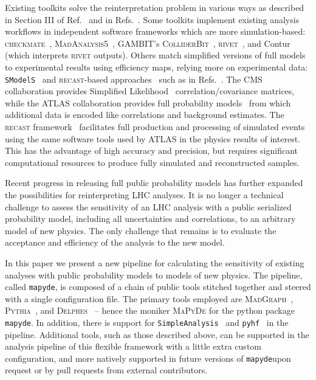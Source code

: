 \documentclass{article}
\newcommand{\mapyde}{\texttt{mapyde}}
\newcommand{\simpleanalysis}{\texttt{SimpleAnalysis}}
\newcommand{\madgraph}{\textsc{MadGraph}}
\newcommand{\pythia}{\textsc{Pythia}}
\newcommand{\delphes}{\textsc{Delphes}}
\newcommand{\pyhf}{\texttt{pyhf}}
\newcommand{\recast}{\textsc{recast}}
\begin{document}
Existing toolkits solve the reinterpretation problem in various ways as described in Section III of Ref.~\cite{LHCReinterpretationForum:2020xtr} and in Refs.~\cite{Cranmer:2021urp,Bailey:2022tdz}.  Some toolkits implement existing analysis workflows in independent software frameworks which are more simulation-based: \textsc{checkmate}~\cite{Dercks:2016npn}, \textsc{MadAnalysis5}~\cite{Conte:2018vmg,Araz:2020lnp,Dumont:2014tja}, \textsc{GAMBIT}'s \textsc{ColliderBit}~\cite{GAMBIT:2017yxo,Kvellestad:2019vxm,GAMBIT:2018gjo,zenodo:gambit}, \textsc{rivet}~\cite{Bierlich:2019rhm,Bierlich:2020wms}, and Contur~\cite{Buckley:2021neu} (which interprets \textsc{rivet} outputs).  Others match simplified versions of full models to experimental results using efficiency maps, relying more on experimental data: \texttt{SModelS}~\cite{Alguero:2021dig} and \recast-based approaches~\cite{Cranmer:2010hk} such as in Refs.~\cite{zenodo:LHCreinterpretation,llpRepo,RECAST1,RECAST2,RECAST3}.  The CMS collaboration provides Simplified Likelihood~\cite{CMS-NOTE-2017-001} correlation/covariance matrices, while the ATLAS collaboration provides full probability models~\cite{ATL-PHYS-PUB-2019-029} from which additional data is encoded like correlations and background estimates. The \recast{} framework~\cite{Cranmer:2010hk} facilitates full production and processing of simulated events using the same software tools used by ATLAS in the physics results of interest.  This has the advantage of high accuracy and precision, but requires significant computational resources to produce fully simulated and reconstructed samples.

Recent progress in releasing full public probability models has further expanded the possibilities for reinterpreting LHC analyses.  It is no longer a technical challenge to assess the sensitivity of an LHC analysis with a public serialized probability model, including all uncertainties and correlations, to an arbitrary model of new physics.  The only challenge that remains is to evaluate the acceptance and efficiency of the analysis to the new model.

In this paper we present a new pipeline for calculating the sensitivity of existing analyses with public probability models to models of new physics.  The pipeline, called \mapyde, is composed of a chain of public tools stitched together and steered with a single configuration file.  The primary tools employed are \madgraph~\cite{Alwall:2014hca,Frederix:2018nkq}, \pythia~\cite{Bierlich:2022pfr}, and \delphes~\cite{deFavereau:2013fsa,Selvaggi:2014mya,Mertens:2015kba} -- hence the moniker \textsc{MaPyDe} for the python package \mapyde. In addition, there is support for \simpleanalysis~\cite{simpleanalysis,atlas_simpleanalysis} and \pyhf~\cite{pyhf,pyhf_joss} in the pipeline. Additional tools, such as those described above, can be supported in the analysis pipeline of this flexible framework with a little extra custom configuration, and more natively supported in future versions of \mapyde upon request or by pull requests from external contributors.
\end{document}
